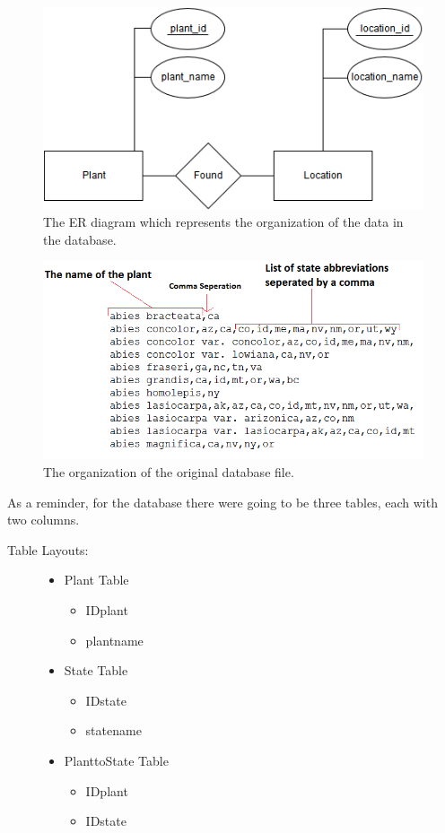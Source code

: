 \documentclass{Group6_Phase2}
\begin{document}
\begin{figure}[htb]
	\centering
	\includegraphics[scale=0.5]{FinalProject_ERdiagram.png}
	\caption{The ER diagram which represents the organization of the data in the database.}
\end{figure}

\begin{figure}[htb]
	\centering
	\includegraphics[scale=0.4]{original_database_file.png}
	\caption{The organization of the original database file.}
\end{figure}

As a reminder, for the database there were going to be three tables, each with two columns. 
\begin{description}
	\item[Table Layouts:] \hfill
	\begin{itemize}
		\item Plant Table
			\begin{itemize}
				\item IDplant
				\item plantname
			\end{itemize}
		\item State Table
		\begin{itemize}
			\item IDstate
			\item statename
		\end{itemize}
		\item PlanttoState Table
		\begin{itemize}
			\item IDplant
			\item IDstate
		\end{itemize}
	\end{itemize}
\end{description}
\end{document}
